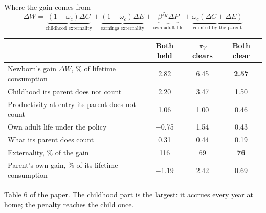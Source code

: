 \documentclass[aspectratio=169,11pt]{beamer}
\newcommand{\source}[1]{\par\vfill{\color{lgrey}\tiny #1}}
\begin{document}
\begin{frame}{Where the gain comes from}
\[
\Delta W=\underbrace{(1-\omega_c)\Delta C}_{\text{childhood externality}}+\underbrace{(1-\omega_c)\Delta E}_{\text{earnings externality}}+\underbrace{\beta^{J_K}\Delta P}_{\text{own adult life}}+\underbrace{\omega_c(\Delta C+\Delta E)}_{\text{counted by the parent}}
\]
\centering\small
\begin{tabular}{@{}lccc@{}}
\toprule
 & Both held & $\pi_V$ clears & Both clear\\
\midrule
Newborn's gain $\Delta W$, \% of lifetime consumption & 2.82 & 6.45 & \textbf{2.57}\\
\quad Childhood its parent does not count & 2.20 & 3.47 & 1.50\\
\quad Productivity at entry its parent does not count & 1.06 & 1.00 & 0.46\\
\quad Own adult life under the policy & $-$0.75 & 1.54 & 0.43\\
\quad What its parent does count & 0.31 & 0.44 & 0.19\\
\midrule
Externality, \% of the gain & 116 & 69 & \textbf{76}\\
Parent's own gain, \% of its lifetime consumption & $-$1.19 & 2.42 & 0.69\\
\bottomrule
\end{tabular}
\source{Table 6 of the paper. The childhood part is the largest: it accrues every year at home; the penalty reaches the child once.}
\end{frame}
\end{document}
